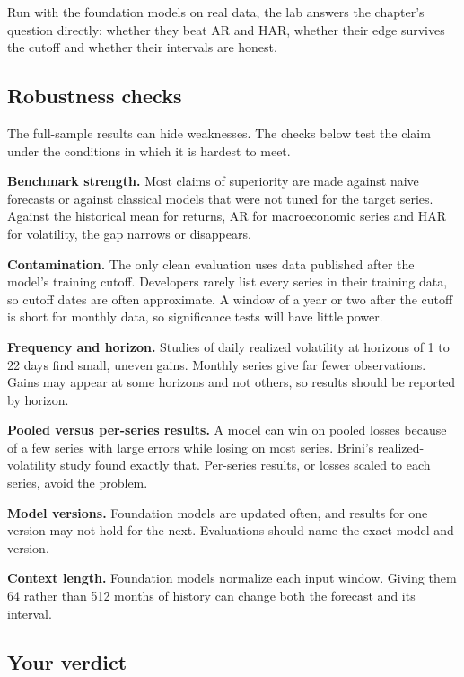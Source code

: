 Run with the foundation models on real data, the lab answers the chapter's question directly: whether they beat AR and HAR, whether their edge survives the cutoff and whether their intervals are honest.

\subsection{Robustness checks}
\label{sec:21-stress}

The full-sample results can hide weaknesses. The checks below test the claim under the conditions in which it is hardest to meet.

\textbf{Benchmark strength.} Most claims of superiority are made against naive forecasts or against classical models that were not tuned for the target series. Against the historical mean for returns, AR for macroeconomic series and HAR for volatility, the gap narrows or disappears.

\textbf{Contamination.} The only clean evaluation uses data published after the model's training cutoff. Developers rarely list every series in their training data, so cutoff dates are often approximate. A window of a year or two after the cutoff is short for monthly data, so significance tests will have little power.

\textbf{Frequency and horizon.} Studies of daily realized volatility at horizons of 1 to 22 days find small, uneven gains. Monthly series give far fewer observations. Gains may appear at some horizons and not others, so results should be reported by horizon.

\textbf{Pooled versus per-series results.} A model can win on pooled losses because of a few series with large errors while losing on most series. Brini's realized-volatility study found exactly that. Per-series results, or losses scaled to each series, avoid the problem.

\textbf{Model versions.} Foundation models are updated often, and results for one version may not hold for the next. Evaluations should name the exact model and version.

\textbf{Context length.} Foundation models normalize each input window. Giving them 64 rather than 512 months of history can change both the forecast and its interval.

\subsection*{Your verdict}


